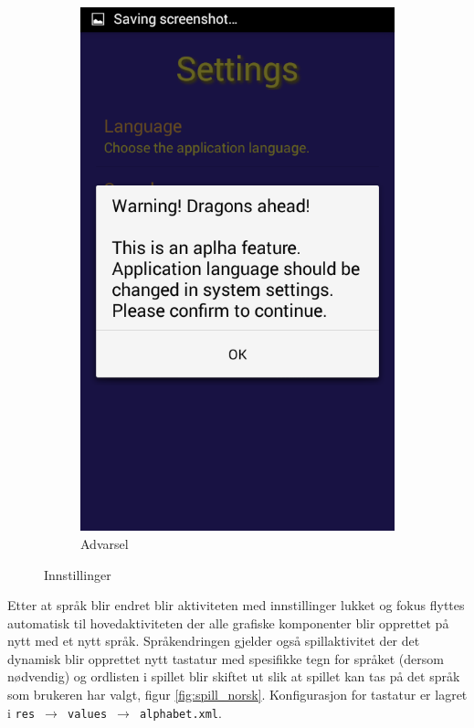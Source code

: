 \begin{figure}[ht]
\begin{subfigure}[b]{0.3\textwidth}
        \includegraphics[width=\textwidth]{./img/bruksanvisning/9.png}
        \caption{Advarsel}
        \label{fig:innstillinger_advarsel}
    \end{subfigure}
    \caption{Innstillinger}\label{fig:innstillinger}
\end{figure}

Etter at språk blir endret blir aktiviteten med innstillinger lukket og fokus flyttes automatisk til hovedaktiviteten der alle grafiske komponenter blir opprettet på nytt med et nytt språk. Språkendringen gjelder også spillaktivitet der det dynamisk blir opprettet nytt tastatur med spesifikke tegn for språket (dersom nødvendig) og ordlisten i spillet blir skiftet ut slik at spillet kan tas på det språk som brukeren har valgt, figur \ref{fig:spill_norsk}. Konfigurasjon for tastatur er lagret i \texttt{res $\rightarrow$ values $\rightarrow$ alphabet.xml}.

